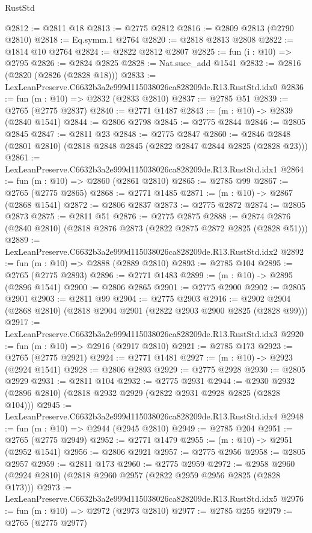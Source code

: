 \begin{lexlean}{RustStd}
\begin{coremodule}
@2812 := @2811 @18
@2813 := @2775 @2812
@2816 := @2809 @2813 (@2790 @2810)
@2818 := Eq.symm.{1} @2764
@2820 := @2818 @2813 @2808
@2822 := @1814 @10 @2764
@2824 := @2822 @2812 @2807
@2825 := fun (i : @10) => @2795
@2826 := @2824 @2825
@2828 := Nat.succ_add @1541
@2832 := @2816 (@2820 (@2826 (@2828 @18)))
@2833 := LexLeanPreserve.C6632b3a2e999d115038026ca828209de.R13.RustStd.idx0
@2836 := fun (m : @10) => @2832 (@2833 @2810)
@2837 := @2785 @51
@2839 := @2765 (@2775 @2837)
@2840 := @2771 @1487
@2843 := (m : @10) -> @2839 (@2840 @1541)
@2844 := @2806 @2798
@2845 := @2775 @2844
@2846 := @2805 @2845
@2847 := @2811 @23
@2848 := @2775 @2847
@2860 := @2846 @2848 (@2801 @2810) (@2818 @2848 @2845 (@2822 @2847 @2844 @2825 (@2828 @23)))
@2861 := LexLeanPreserve.C6632b3a2e999d115038026ca828209de.R13.RustStd.idx1
@2864 := fun (m : @10) => @2860 (@2861 @2810)
@2865 := @2785 @99
@2867 := @2765 (@2775 @2865)
@2868 := @2771 @1485
@2871 := (m : @10) -> @2867 (@2868 @1541)
@2872 := @2806 @2837
@2873 := @2775 @2872
@2874 := @2805 @2873
@2875 := @2811 @51
@2876 := @2775 @2875
@2888 := @2874 @2876 (@2840 @2810) (@2818 @2876 @2873 (@2822 @2875 @2872 @2825 (@2828 @51)))
@2889 := LexLeanPreserve.C6632b3a2e999d115038026ca828209de.R13.RustStd.idx2
@2892 := fun (m : @10) => @2888 (@2889 @2810)
@2893 := @2785 @104
@2895 := @2765 (@2775 @2893)
@2896 := @2771 @1483
@2899 := (m : @10) -> @2895 (@2896 @1541)
@2900 := @2806 @2865
@2901 := @2775 @2900
@2902 := @2805 @2901
@2903 := @2811 @99
@2904 := @2775 @2903
@2916 := @2902 @2904 (@2868 @2810) (@2818 @2904 @2901 (@2822 @2903 @2900 @2825 (@2828 @99)))
@2917 := LexLeanPreserve.C6632b3a2e999d115038026ca828209de.R13.RustStd.idx3
@2920 := fun (m : @10) => @2916 (@2917 @2810)
@2921 := @2785 @173
@2923 := @2765 (@2775 @2921)
@2924 := @2771 @1481
@2927 := (m : @10) -> @2923 (@2924 @1541)
@2928 := @2806 @2893
@2929 := @2775 @2928
@2930 := @2805 @2929
@2931 := @2811 @104
@2932 := @2775 @2931
@2944 := @2930 @2932 (@2896 @2810) (@2818 @2932 @2929 (@2822 @2931 @2928 @2825 (@2828 @104)))
@2945 := LexLeanPreserve.C6632b3a2e999d115038026ca828209de.R13.RustStd.idx4
@2948 := fun (m : @10) => @2944 (@2945 @2810)
@2949 := @2785 @204
@2951 := @2765 (@2775 @2949)
@2952 := @2771 @1479
@2955 := (m : @10) -> @2951 (@2952 @1541)
@2956 := @2806 @2921
@2957 := @2775 @2956
@2958 := @2805 @2957
@2959 := @2811 @173
@2960 := @2775 @2959
@2972 := @2958 @2960 (@2924 @2810) (@2818 @2960 @2957 (@2822 @2959 @2956 @2825 (@2828 @173)))
@2973 := LexLeanPreserve.C6632b3a2e999d115038026ca828209de.R13.RustStd.idx5
@2976 := fun (m : @10) => @2972 (@2973 @2810)
@2977 := @2785 @255
@2979 := @2765 (@2775 @2977)

\end{coremodule}
\end{lexlean}
